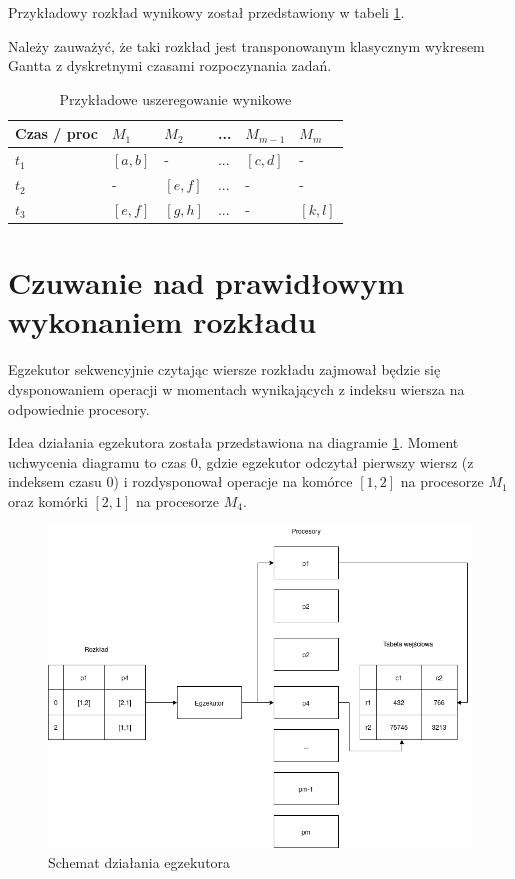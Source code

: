 \documentclass[brudnopis]{xmgr}
\begin{document}
Przykładowy rozkład wynikowy został przedstawiony w tabeli \ref{tab:example-sched-out}.
\medskip

Należy zauważyć, że taki rozkład jest transponowanym klasycznym wykresem Gantta z dyskretnymi czasami rozpoczynania zadań.

\begin{table}[!tbh]
\begin{tabular}{|l|l|l|l|l|l|} \hline
Czas / proc & $M_1$     & $M_2$     & ...   & $M_{m-1}$ & $M_{m}$ \\ \hline
$t_1$       & $[a,b]$   & -         & ...   & $[c,d]$   & - \\ \hline
$t_2$       & -         & $[e,f]$   & ...   & -         & - \\ \hline
$t_3$       & $[e,f]$   & $[g,h]$   & ...   & -         & $[k,l]$\\ \hline
\end{tabular}
\caption{Przykładowe uszeregowanie wynikowe\label{tab:example-sched-out}}
\end{table}


\section{Czuwanie nad prawidłowym wykonaniem rozkładu}

Egzekutor sekwencyjnie czytając wiersze rozkładu zajmował będzie się dysponowaniem operacji w momentach wynikających z indeksu wiersza na odpowiednie procesory.
\medskip

Idea działania egzekutora została przedstawiona na diagramie \ref{diag:executor}. Moment uchwycenia diagramu 
to czas 0, gdzie egzekutor odczytał pierwszy wiersz (z indeksem czasu 0) i rozdysponował operacje na komórce $[1,2]$ na procesorze $M_1$ oraz komórki $[2,1]$ na procesorze $M_4$.
\medskip

\begin{figure}[!tbh]
\centering
\includegraphics[width=.8\hsize]{fig/executor.png}
\caption{Schemat działania egzekutora\label{diag:executor}}
\end{figure}
\medskip
\end{document}
